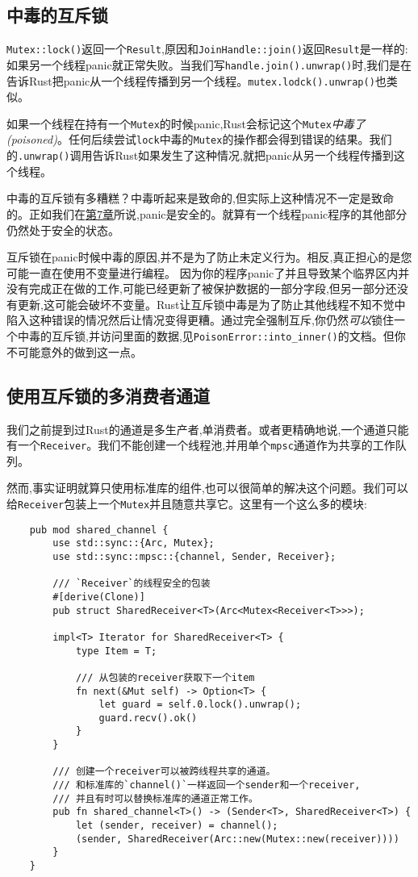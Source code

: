 \subsection{中毒的互斥锁}
\texttt{Mutex::lock()}返回一个\texttt{Result},原因和\texttt{JoinHandle::join()}返回\texttt{Result}是一样的:如果另一个线程panic就正常失败。当我们写\texttt{handle.join().unwrap()}时,我们是在告诉Rust把panic从一个线程传播到另一个线程。\texttt{mutex.lodck().unwrap()}也类似。

如果一个线程在持有一个\texttt{Mutex}的时候panic,Rust会标记这个\texttt{Mutex}\emph{中毒了(poisoned)}。任何后续尝试\texttt{lock}中毒的\texttt{Mutex}的操作都会得到错误的结果。我们的\texttt{.unwrap()}调用告诉Rust如果发生了这种情况,就把panic从另一个线程传播到这个线程。

中毒的互斥锁有多糟糕？中毒听起来是致命的,但实际上这种情况不一定是致命的。正如我们在\hyperref[ch07]{第7章}所说,panic是安全的。就算有一个线程panic程序的其他部分仍然处于安全的状态。

互斥锁在panic时候中毒的原因,并不是为了防止未定义行为。相反,真正担心的是您可能一直在使用不变量进行编程。 因为你的程序panic了并且导致某个临界区内并没有完成正在做的工作,可能已经更新了被保护数据的一部分字段,但另一部分还没有更新,这可能会破坏不变量。Rust让互斥锁中毒是为了防止其他线程不知不觉中陷入这种错误的情况然后让情况变得更糟。通过完全强制互斥,你仍然\emph{可以}锁住一个中毒的互斥锁,并访问里面的数据,见\texttt{PoisonError::into\_inner()}的文档。但你不可能意外的做到这一点。

\subsection{使用互斥锁的多消费者通道}
我们之前提到过Rust的通道是多生产者,单消费者。或者更精确地说,一个通道只能有一个\texttt{Receiver}。我们不能创建一个线程池,并用单个\texttt{mpsc}通道作为共享的工作队列。

然而,事实证明就算只使用标准库的组件,也可以很简单的解决这个问题。我们可以给\texttt{Receiver}包装上一个\texttt{Mutex}并且随意共享它。这里有一个这么多的模块:
\begin{verbatim}
    pub mod shared_channel {
        use std::sync::{Arc, Mutex};
        use std::sync::mpsc::{channel, Sender, Receiver};

        /// `Receiver`的线程安全的包装
        #[derive(Clone)]
        pub struct SharedReceiver<T>(Arc<Mutex<Receiver<T>>>);

        impl<T> Iterator for SharedReceiver<T> {
            type Item = T;

            /// 从包装的receiver获取下一个item
            fn next(&Mut self) -> Option<T> {
                let guard = self.0.lock().unwrap();
                guard.recv().ok()
            }
        }

        /// 创建一个receiver可以被跨线程共享的通道。
        /// 和标准库的`channel()`一样返回一个sender和一个receiver,
        /// 并且有时可以替换标准库的通道正常工作。
        pub fn shared_channel<T>() -> (Sender<T>, SharedReceiver<T>) {
            let (sender, receiver) = channel();
            (sender, SharedReceiver(Arc::new(Mutex::new(receiver))))
        }
    }
\end{verbatim}

